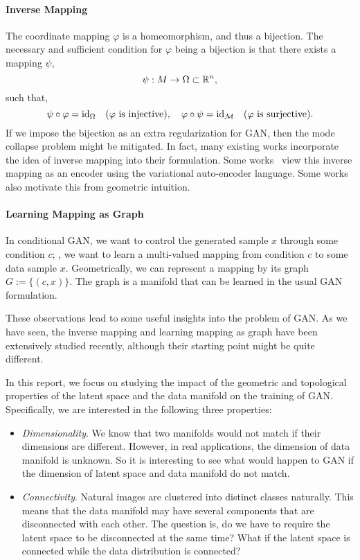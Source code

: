 \paragraph{Inverse Mapping}
The coordinate mapping $\varphi$ is a homeomorphism,
and thus a bijection.
The necessary and sufficient condition for $\varphi$ being a bijection is
that there exists a mapping $\psi$,
\begin{equation}
    \psi:M\to \Omega\subset{\mathbb{R}}^n,
\end{equation}
such that,
\begin{equation}
    \psi\circ\varphi = {\mathop{\mathrm{id}}}_\Omega \quad
    (\varphi\text{ is injective}), \quad
    \varphi\circ\psi = {\mathop{\mathrm{id}}}_{\mathcal{M}} \quad
    (\varphi\text{ is surjective}).
\end{equation}
If we impose the bijection as an extra regularization for GAN,
then the mode collapse problem might be mitigated.
In fact,
many existing works incorporate the idea of
inverse mapping into their formulation.
Some works~\cite{huang2016stacked,che2016mode,kim2017learning,perarnau2016invertible}
view this inverse mapping as an encoder using the
variational auto-encoder language.
Some works~\cite{zhu2016generative,zhu2017unpaired} also
motivate this from geometric intuition.

\paragraph{Learning Mapping as Graph}
In conditional GAN,
we want to control the generated sample $x$ through some condition $c$;
\ie,
we want to learn a multi-valued mapping from condition $c$ to
some data sample $x$.
Geometrically,
we can represent a mapping by its graph $G:=\{(c,x)\}$.
The graph is a manifold that can be learned in the usual GAN formulation.

These observations lead to some useful insights into the problem of GAN.
As we have seen,
the inverse mapping and learning mapping as graph have been
extensively studied recently,
although their starting point might be quite different.

In this report,
we focus on studying the impact of the geometric and topological
properties of the latent space and the data manifold on the training of GAN.
Specifically,
we are interested in the following three properties:
\begin{itemize}
    \item \emph{Dimensionality}.
        We know that two manifolds would not match
        if their dimensions are different.
        However, in real applications,
        the dimension of data manifold is unknown.
        So it is interesting to see what would happen to GAN if the dimension
        of latent space and data manifold do not match.
    \item \emph{Connectivity}.
        Natural images are clustered into distinct classes naturally.
        This means that the data manifold may have several components
        that are disconnected with each other.
        The question is,
        do we have to require the latent space to be disconnected
        at the same time?
        What if the latent space is connected while the data distribution
        is connected?
\end{itemize}
